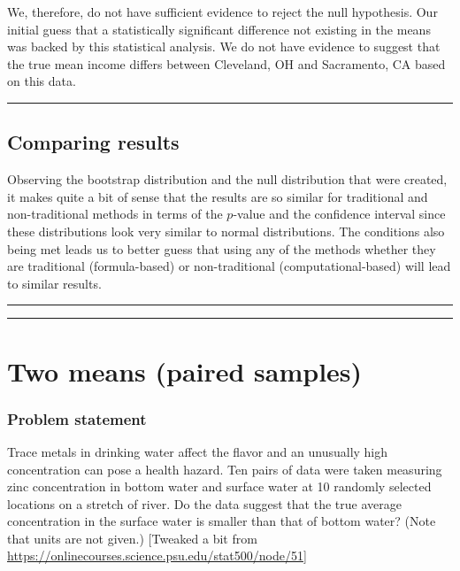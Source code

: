 \documentclass[12pt,]{krantz}
\theoremstyle{definition}
\theoremstyle{definition}
\theoremstyle{definition}
\theoremstyle{remark}
\begin{document}
We, therefore, do not have sufficient evidence to reject the null
hypothesis. Our initial guess that a statistically significant
difference not existing in the means was backed by this statistical
analysis. We do not have evidence to suggest that the true mean income
differs between Cleveland, OH and Sacramento, CA based on this data.

\begin{center}\rule{0.5\linewidth}{\linethickness}\end{center}

\subsection{Comparing results}\label{comparing-results-3}

Observing the bootstrap distribution and the null distribution that were
created, it makes quite a bit of sense that the results are so similar
for traditional and non-traditional methods in terms of the \(p\)-value
and the confidence interval since these distributions look very similar
to normal distributions. The conditions also being met leads us to
better guess that using any of the methods whether they are traditional
(formula-based) or non-traditional (computational-based) will lead to
similar results.

\begin{center}\rule{0.5\linewidth}{\linethickness}\end{center}

\begin{center}\rule{0.5\linewidth}{\linethickness}\end{center}

\section{Two means (paired samples)}\label{two-means-paired-samples}

\subsubsection*{Problem statement}\label{problem-statement-4}


Trace metals in drinking water affect the flavor and an unusually high
concentration can pose a health hazard. Ten pairs of data were taken
measuring zinc concentration in bottom water and surface water at 10
randomly selected locations on a stretch of river. Do the data suggest
that the true average concentration in the surface water is smaller than
that of bottom water? (Note that units are not given.) {[}Tweaked a bit
from \url{https://onlinecourses.science.psu.edu/stat500/node/51}{]}
\end{document}
